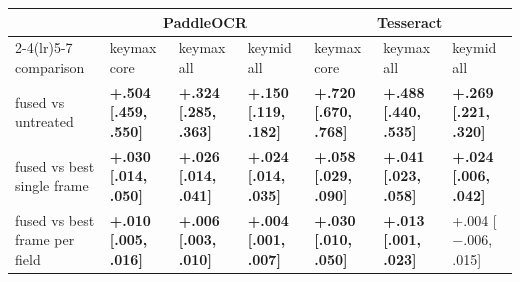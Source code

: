 \begin{tabular}{lllllll}
\toprule
 & \multicolumn{3}{c}{PaddleOCR} & \multicolumn{3}{c}{Tesseract} \\
\cmidrule(lr){2-4}\cmidrule(lr){5-7}
comparison & keymax core & keymax all & keymid all & keymax core & keymax all & keymid all \\
\midrule
fused vs untreated & \textbf{+.504 [.459, .550]} & \textbf{+.324 [.285, .363]} & \textbf{+.150 [.119, .182]} & \textbf{+.720 [.670, .768]} & \textbf{+.488 [.440, .535]} & \textbf{+.269 [.221, .320]} \\
fused vs best single frame & \textbf{+.030 [.014, .050]} & \textbf{+.026 [.014, .041]} & \textbf{+.024 [.014, .035]} & \textbf{+.058 [.029, .090]} & \textbf{+.041 [.023, .058]} & \textbf{+.024 [.006, .042]} \\
fused vs best frame per field & \textbf{+.010 [.005, .016]} & \textbf{+.006 [.003, .010]} & \textbf{+.004 [.001, .007]} & \textbf{+.030 [.010, .050]} & \textbf{+.013 [.001, .023]} & +.004 [$-$.006, .015] \\
\bottomrule
\end{tabular}
